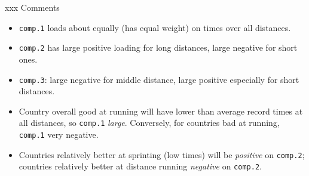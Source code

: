 \documentclass[ignorenonframetext,]{beamer}
\begin{document}
\begin{frame}[fragile]{xxx Comments}
\protect\hypertarget{xxx-comments-2}{}

\begin{itemize}
\item
  \texttt{comp.1} loads about equally (has equal weight) on times over
  all distances.
\item
  \texttt{comp.2} has large positive loading for long distances, large
  negative for short ones.
\item
  \texttt{comp.3}: large negative for middle distance, large positive
  especially for short distances.
\item
  Country overall good at running will have lower than average record
  times at all distances, so \texttt{comp.1} \emph{large}. Conversely,
  for countries bad at running, \texttt{comp.1} very negative.
\item
  Countries relatively better at sprinting (low times) will be
  \emph{positive} on \texttt{comp.2}; countries relatively better at
  distance running \emph{negative} on \texttt{comp.2}.
\end{itemize}

\end{frame}
\end{document}
